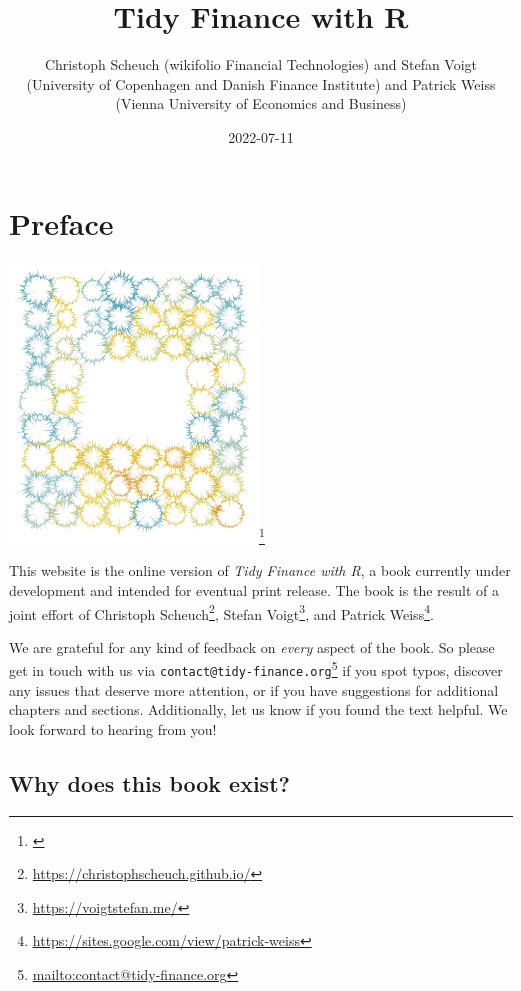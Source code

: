 \documentclass[
]{book}
\title{Tidy Finance with R}
\author{Christoph Scheuch (wikifolio Financial Technologies) and Stefan Voigt (University of Copenhagen and Danish Finance Institute) and Patrick Weiss (Vienna University of Economics and Business)}
\date{2022-07-11}
\renewcommand{\href}[2]{#2\footnote{\url{#1}}}
\begin{document}
\maketitle

\setlength{\abovedisplayskip}{-5pt}
\setlength{\abovedisplayshortskip}{-5pt}

\mainmatter

{
\setcounter{tocdepth}{2}
\tableofcontents
}
\hypertarget{preface}{%
\chapter*{Preface}\label{preface}}


\href{}{\includegraphics[width=2.60417in,height=\textheight]{cover.jpg}}

This website is the online version of \emph{Tidy Finance with R}, a book currently under development and intended for eventual print release. The book is the result of a joint effort of \href{https://christophscheuch.github.io/}{Christoph Scheuch}, \href{https://voigtstefan.me/}{Stefan Voigt}, and \href{https://sites.google.com/view/patrick-weiss}{Patrick Weiss}.

We are grateful for any kind of feedback on \emph{every} aspect of the book. So please get in touch with us via \href{mailto:contact@tidy-finance.org}{\nolinkurl{contact@tidy-finance.org}} if you spot typos, discover any issues that deserve more attention, or if you have suggestions for additional chapters and sections. Additionally, let us know if you found the text helpful. We look forward to hearing from you!

\hypertarget{why-does-this-book-exist}{%
\section*{Why does this book exist?}\label{why-does-this-book-exist}}
\end{document}
